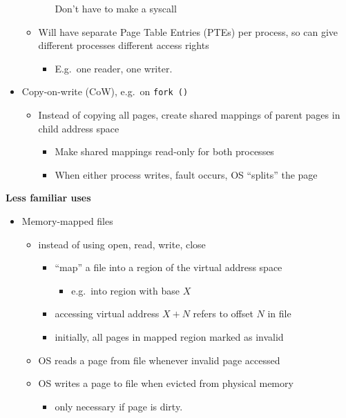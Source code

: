 \documentclass[11pt,a4paper]{article}
\begin{document}
\begin{itemize}
\begin{itemize}
\begin{itemize}
                        Don't have to make a syscall
                \end{itemize}
            \item Will have separate Page Table Entries (PTEs) per process, so can give
                different processes different access rights
                \begin{itemize}
                    \item E.g.\ one reader, one writer.
                \end{itemize}
        \end{itemize}
    \item Copy-on-write (CoW), e.g.\ on \texttt{fork\,()}
        \begin{itemize}
            \item Instead of copying all pages, create shared mappings of parent pages in child
                address space
                \begin{itemize}
                    \item Make shared mappings read-only for both processes
                    \item When either process writes, fault occurs, OS ``splits'' the page
                \end{itemize}
        \end{itemize}
\end{itemize}

\textbf{Less familiar uses}
\begin{itemize}
    \item Memory-mapped files
        \begin{itemize}
            \item instead of using open, read, write, close
                \begin{itemize}
                    \item ``map'' a file into a region of the virtual address space
                        \begin{itemize}
                            \item e.g.\ into region with base $X$
                        \end{itemize}
                    \item accessing virtual address $X+N$ refers to offset $N$ in file
                    \item initially, all pages in mapped region marked as invalid
                \end{itemize}
            \item OS reads a page from file whenever invalid page accessed
            \item OS writes a page to file when evicted from physical memory
                \begin{itemize}
                    \item only necessary if page is dirty.
                \end{itemize}
        \end{itemize}
\end{itemize}
\end{document}
